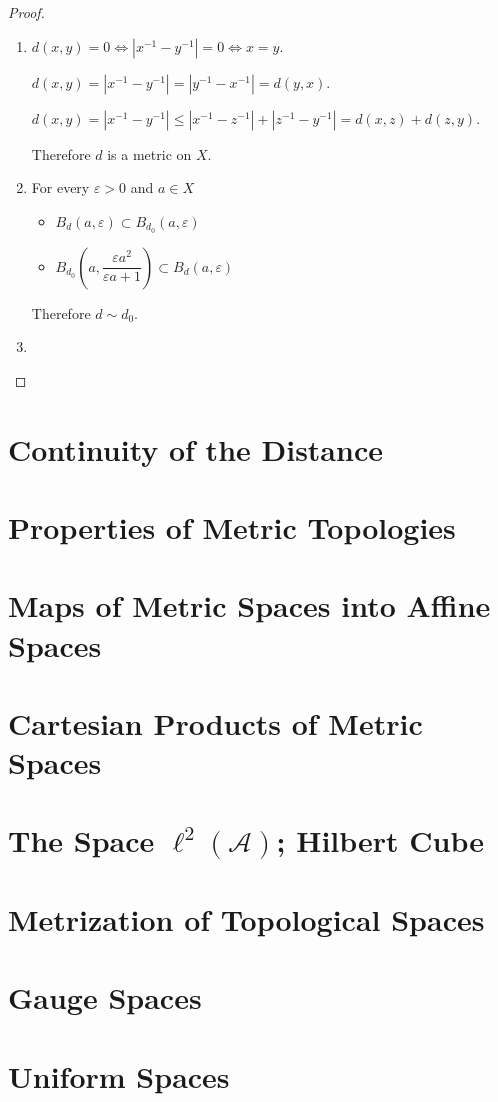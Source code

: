\begin{proof}
	\begin{enumerate}[label={(\alph*)}]
		\item \( d(x, y) = 0 \iff \left\vert x^{-1} - y^{-1} \right\vert = 0 \iff x = y \).

		      \( d(x, y) = \left\vert x^{-1} - y^{-1} \right\vert = \left\vert y^{-1} - x^{-1} \right\vert = d(y, x) \).

		      \( d(x, y) =  \left\vert x^{-1} - y^{-1} \right\vert \le \left\vert x^{-1} - z^{-1} \right\vert + \left\vert z^{-1} - y^{-1} \right\vert = d(x, z) + d(z, y) \).

		      Therefore \( d \) is a metric on \( X \).
		\item For every \( \varepsilon > 0 \) and \( a \in X \)
		      \begin{itemize}
			      \item \( B_{d}(a, \varepsilon) \subset B_{d_{0}}(a, \varepsilon) \)
			      \item \( B_{d_{0}}\left(a, \dfrac{\varepsilon a^{2}}{\varepsilon a + 1}\right) \subset B_{d}(a, \varepsilon) \)
		      \end{itemize}

		      Therefore \( d \sim d_{0} \).
		\item %
	\end{enumerate}
\end{proof}

\section{Continuity of the Distance}

\section{Properties of Metric Topologies}

\section{Maps of Metric Spaces into Affine Spaces}

\section{Cartesian Products of Metric Spaces}

\section{The Space \( \ell^{2}(\mathscr{A}) \); Hilbert Cube}

\section{Metrization of Topological Spaces}

\section{Gauge Spaces}

\section{Uniform Spaces}
